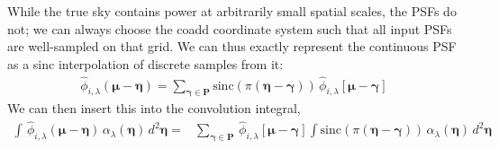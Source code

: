\documentclass[DM,authoryear,toc]{lsstdoc}
\begin{document}
While the true sky contains power at arbitrarily small spatial scales, the PSFs do not; we can always choose the coadd coordinate system such that all
input PSFs are well-sampled on that grid.
We can thus exactly represent the continuous PSF as a sinc interpolation of
discrete samples from it:
\begin{align}
    \hat{\phi}_{i,\lambda}(\bm{\mu}-\bm{\eta}) =
    \sum_{\bm{\gamma} \in \bm{P}}
        \mathrm{sinc}(\pi(\bm{\eta}-\bm{\gamma}))
        \,\hat{\phi}_{i,\lambda}[\bm{\mu}-\bm{\gamma}]
\end{align}
We can then insert this into the convolution integral,
\begin{align}
    \int\!
        \, \hat{\phi}_{i,\lambda}(\bm{\mu}-\bm{\eta})
        \, \alpha_{\lambda}(\bm{\eta})
        \, d^2\bm{\eta}
    = &
    \sum_{\bm{\gamma} \in \bm{P}}
        \,\hat{\phi}_{i,\lambda}[\bm{\mu}-\bm{\gamma}]
        \int\!
        \mathrm{sinc}(\pi(\bm{\eta}-\bm{\gamma}))
        \, \alpha_{\lambda}(\bm{\eta})
        \, d^2\bm{\eta}
\end{align}


\end{document}
